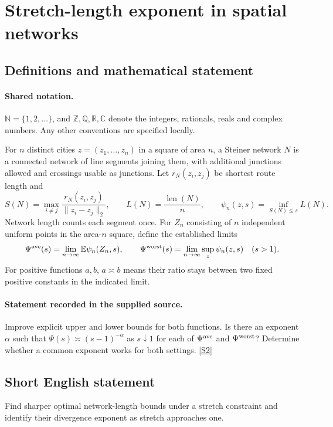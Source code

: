 \documentclass[11pt]{article}
\newcommand{\sref}[2]{\hyperlink{source:#1:#2}{[S#2]}}
\begin{document}
\section{Stretch-length exponent in spatial networks}\label{statement}

\subsection{Definitions and mathematical statement}

\paragraph{Shared notation.}$\mathbb N=\{1,2,\ldots\}$, and $\mathbb Z,\mathbb Q,\mathbb R,\mathbb C$ denote the integers, rationals, reals and complex numbers. Any other conventions are specified locally.


For $n$ distinct cities $z=(z_1,\ldots,z_n)$ in a square of area $n$, a Steiner network $N$ is a connected network of line segments joining them, with additional junctions allowed and crossings usable as junctions. Let $r_N(z_i,z_j)$ be shortest route length and
\[S(N)=\max_{i\ne j}\frac{r_N(z_i,z_j)}{\|z_i-z_j\|_2},\qquad L(N)=\frac{\operatorname{len}(N)}n,\qquad \psi_n(z,s)=\inf_{S(N)\le s}L(N).\]
Network length counts each segment once. For $Z_n$ consisting of $n$ independent uniform points in the area-$n$ square, define the established limits
\[\Psi^{\rm ave}(s)=\lim_{n\to\infty}\mathbb E\psi_n(Z_n,s),\qquad\Psi^{\rm worst}(s)=\lim_{n\to\infty}\sup_z\psi_n(z,s)\quad(s>1).\]
For positive functions $a,b$, $a\asymp b$ means their ratio stays between two fixed positive constants in the indicated limit.
\paragraph{Statement recorded in the supplied source.}
Improve explicit upper and lower bounds for both functions. Is there an exponent $\alpha$ such that $\Psi(s)\asymp(s-1)^{-\alpha}$ as $s\downarrow1$ for each of $\Psi^{\rm ave}$ and $\Psi^{\rm worst}$? Determine whether a common exponent works for both settings. \sref{statement}{2}
\subsection{Short English statement}
Find sharper optimal network-length bounds under a stretch constraint and identify their divergence exponent as stretch approaches one.
\end{document}
